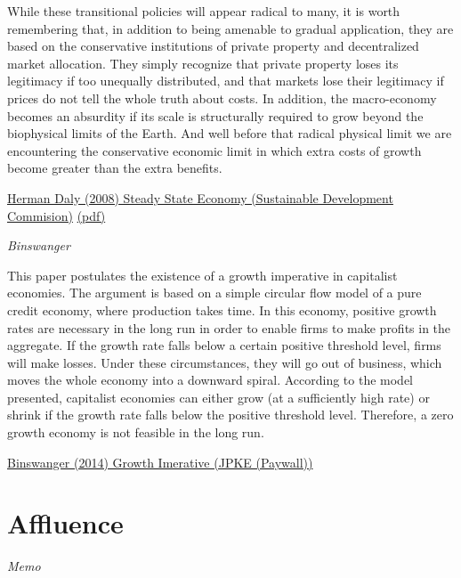 \documentclass[
]{book}
\begin{document}
While these transitional policies will appear radical to many, it is worth remembering that, in addition to being
amenable to gradual application, they are based on the conservative institutions of private property and decentralized
market allocation. They simply recognize that private property loses its legitimacy if too unequally distributed, and
that markets lose their legitimacy if prices do not tell the whole truth about costs. In addition, the macro-economy
becomes an absurdity if its scale is structurally required to grow beyond the biophysical limits of the Earth. And well
before that radical physical limit we are encountering the conservative economic limit in which extra costs of growth
become greater than the extra benefits.

\href{http://www.sd-commission.org.uk/publications.php@id=775.html}{Herman Daly (2008) Steady State Economy (Sustainable Development Commision)}
\href{pdf/Daly_2008_Steady_State_Economy_SD_Commision.pdf}{(pdf)}

\emph{Binswanger}

This paper postulates the existence of a growth imperative in capitalist economies. The argument is based on a simple circular flow model of a pure credit economy, where production takes time. In this economy, positive growth rates are necessary in the long run in order to enable firms to make profits in the aggregate. If the growth rate falls below a certain positive threshold level, firms will make losses. Under these circumstances, they will go out of business, which moves the whole economy into a downward spiral. According to the model presented, capitalist economies can either grow (at a sufficiently high rate) or shrink if the growth rate falls below the positive threshold level. Therefore, a zero growth economy is not feasible in the long run.

\href{https://www.tandfonline.com/doi/abs/10.2753/PKE0160-3477310410}{Binswanger (2014) Growth Imerative (JPKE (Paywall))}

\hypertarget{affluence}{%
\chapter{Affluence}\label{affluence}}

\emph{Memo}
\end{document}
